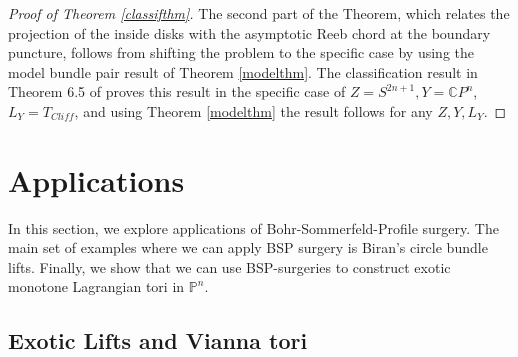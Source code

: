 \documentclass[11pt, oneside,dvipsnames]{amsart}
\renewcommand{\to}{\rightarrow}
\renewcommand{\to}{\rightarrow}
\newcommand{\<}{\langle}
\renewcommand{\>}{\rangle}
\newcommand{\bC}{\mathbb{C}}
\newcommand{\bP}{\mathbb{P}}
\newcommand{\cM}{\mathcal{M}}
\renewcommand{\to}{\rightarrow}
\theoremstyle{definition}
\theoremstyle{definition}
\newtheorem{defn}[Theorem]{Definition}
\numberwithin{equation}{subsection}
\begin{document}
\begin{proof}[Proof of Theorem \ref{classifthm}]
    The second part of the Theorem, which relates the projection of the inside disks with the asymptotic Reeb chord at the boundary puncture, follows from shifting the problem to the specific case by using the model bundle pair result of Theorem \ref{modelthm}. The classification result in Theorem 6.5 of \cite{Cha23} proves this result in the specific case of $Z = S^{2n+1}, Y=\bC P^n$, $L_Y = T_{Cliff}$, and using Theorem \ref{modelthm} the result follows for any $Z,Y,L_Y$. 
\end{proof}
\section{Applications}\label{app}

In this section, we explore applications of Bohr-Sommerfeld-Profile surgery. The main set of examples where we can apply BSP surgery is Biran's circle bundle lifts. Finally, we show that we can use BSP-surgeries to construct exotic monotone Lagrangian tori in $\bP^n$.


\subsection{Exotic Lifts and Vianna tori} \label{sub:exonvia}

\end{document}

